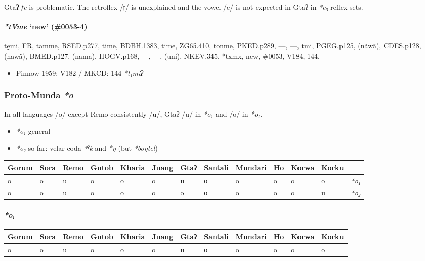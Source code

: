 \documentclass[a4paper,]{article}
\providecommand{\tightlist}{%
  \setlength{\itemsep}{0pt}\setlength{\parskip}{0pt}}
\let\oldparagraph\paragraph
\renewcommand{\paragraph}[1]{\oldparagraph{#1}\mbox{}}
\begin{document}
Gtaʔ \emph{ʈe} is problematic. The retroflex /ʈ/ is unexplained and the
vowel /e/ is not expected in Gtaʔ in \emph{*e₃} reflex sets.

\paragraph{\texorpdfstring{\emph{*tVme} `new'
(\#0053-4)}{*tVme new (\#0053-4)}}\label{tvme-new-0053-4}

tḛmi, FR, tamme, RSED.p277, time, BDBH.1383, time, ZG65.410, tonme,
PKED.p289, ---, ---, tmi, PGEG.p125, (nãwã), CDES.p128, (nawã),
BMED.p127, (nama), HOGV.p168, ---, ---, (uni), NKEV.345, *txmx, new,
\#0053, V184, 144,

\begin{itemize}
\tightlist
\item
  Pinnow 1959: V182 / MKCD: 144 \emph{*t₁miʔ}
\end{itemize}

\subsubsection{\texorpdfstring{Proto-Munda
\emph{*o}}{Proto-Munda *o}}\label{proto-munda-o}

In all languages /o/ except Remo consistently /u/, Gtaʔ /u/ in
\emph{*o₁} and /o/ in \emph{*o₂}.

\begin{itemize}
\tightlist
\item
  \emph{*o₁} general
\item
  \emph{*o₂} so far: velar coda \emph{*ˀk} and \emph{*ŋ} (but
  \emph{*boŋtel})
\end{itemize}

\begin{longtable}[]{@{}lllllllllllll@{}}
\toprule
Gorum & Sora & Remo & Gutob & Kharia & Juang & Gtaʔ & Santali & Mundari
& Ho & Korwa & Korku &\tabularnewline
\midrule
\endhead
o & o & u & o & o & o & u & o̠ & o & o & o & o &
\emph{*o₁}\tabularnewline
o & o & u & o & o & o & o & o̠ & o & o & o & u &
\emph{*o₂}\tabularnewline
\bottomrule
\end{longtable}

\paragraph{\texorpdfstring{\emph{*o₁}}{*o₁}}\label{o}

\begin{longtable}[]{@{}llllllllllll@{}}
\toprule
Gorum & Sora & Remo & Gutob & Kharia & Juang & Gtaʔ & Santali & Mundari
& Ho & Korwa & Korku\tabularnewline
\midrule
\endhead
o & o & u & o & o & o & u & o̠ & o & o & o & o\tabularnewline
\bottomrule
\end{longtable}
\end{document}
